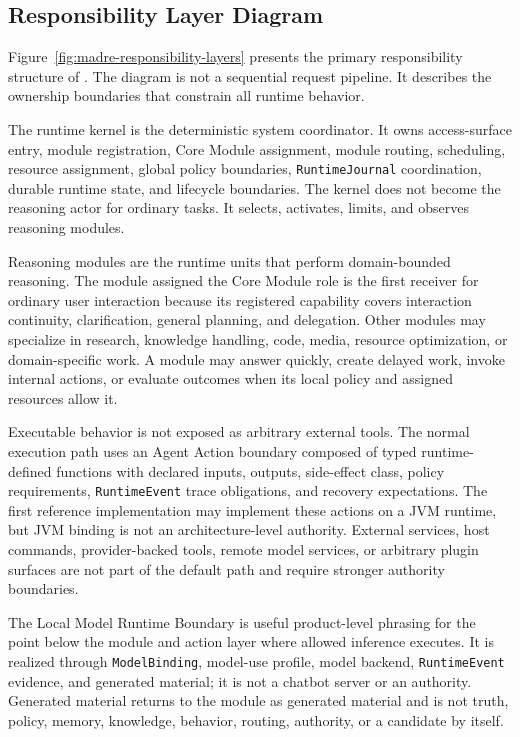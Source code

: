 \documentclass[11pt]{report}
\begin{document}
\subsection{Responsibility Layer Diagram}

Figure~\ref{fig:madre-responsibility-layers} presents the primary responsibility structure of \Madre. The diagram is not a sequential request pipeline. It describes the ownership boundaries that constrain all runtime behavior.

The \Madre runtime kernel is the deterministic system coordinator. It owns access-surface entry, module registration, Core Module assignment, module routing, scheduling, resource assignment, global policy boundaries, \texttt{RuntimeJournal} coordination, durable runtime state, and lifecycle boundaries. The kernel does not become the reasoning actor for ordinary tasks. It selects, activates, limits, and observes reasoning modules.

Reasoning modules are the runtime units that perform domain-bounded reasoning. The module assigned the Core Module role is the first receiver for ordinary user interaction because its registered capability covers interaction continuity, clarification, general planning, and delegation. Other modules may specialize in research, knowledge handling, code, media, resource optimization, or domain-specific work. A module may answer quickly, create delayed work, invoke internal actions, or evaluate outcomes when its local policy and assigned resources allow it.

Executable behavior is not exposed as arbitrary external tools. The normal execution path uses an Agent Action boundary composed of typed runtime-defined functions with declared inputs, outputs, side-effect class, policy requirements, \texttt{RuntimeEvent} trace obligations, and recovery expectations. The first reference implementation may implement these actions on a JVM runtime, but JVM binding is not an architecture-level authority. External services, host commands, provider-backed tools, remote model services, or arbitrary plugin surfaces are not part of the default path and require stronger authority boundaries.

The Local Model Runtime Boundary is useful product-level phrasing for the point below the module and action layer where allowed inference executes. It is realized through \texttt{ModelBinding}, model-use profile, model backend, \texttt{RuntimeEvent} evidence, and generated material; it is not a chatbot server or an authority. Generated material returns to the module as generated material and is not truth, policy, memory, knowledge, behavior, routing, authority, or a candidate by itself.
\end{document}
